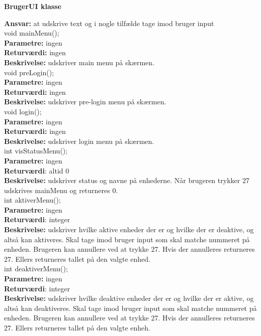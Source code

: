 \newpage

{\centering 
\textbf{BrugerUI klasse}\par
}
\textbf{Ansvar:} at udskrive text og i nogle tilfælde tage imod bruger input \\

void mainMenu(); \\
\textbf{Parametre:} ingen \\
\textbf{Returværdi:} ingen \\
\textbf{Beskrivelse:} udskriver main menu på skærmen. \\

void preLogin(); \\
\textbf{Parametre:} ingen \\
\textbf{Returværdi:} ingen \\
\textbf{Beskrivelse:} udskriver pre-login menu på skærmen. \\

void login(); \\
\textbf{Parametre:} ingen \\
\textbf{Returværdi:} ingen \\
\textbf{Beskrivelse:} udskriver login menu på skærmen. \\

int visStatusMenu(); \\
\textbf{Parametre:} ingen \\
\textbf{Returværdi}: altid 0 \\
\textbf{Beskrivelse:} udskriver status og navne på enhederne. Når brugeren trykker 27 udskrives mainMenu og returneres 0. \\

int aktiverMenu(); \\
\textbf{Parametre:} ingen \\
\textbf{Returværdi}: integer \\
\textbf{Beskrivelse:} udskriver hvilke aktive enheder der er og hvilke der er deaktive, og altså kan aktiveres. Skal tage imod bruger input som skal matche nummeret på enheden. Brugeren kan annullere ved at trykke 27. Hvis der annulleres returneres 27. Ellers returneres tallet på den valgte enhed. \\

int deaktiverMenu(); \\
\textbf{Parametre:} ingen \\
\textbf{Returværdi}: integer \\
\textbf{Beskrivelse:} udskriver hvilke deaktive enheder der er og hvilke der er aktive, og altså kan deaktiveres. Skal tage imod bruger input som skal matche nummeret på enheden. Brugeren kan annullere ved at trykke 27. Hvis der annulleres returneres 27. Ellers returneres tallet på den valgte enheh. \\

